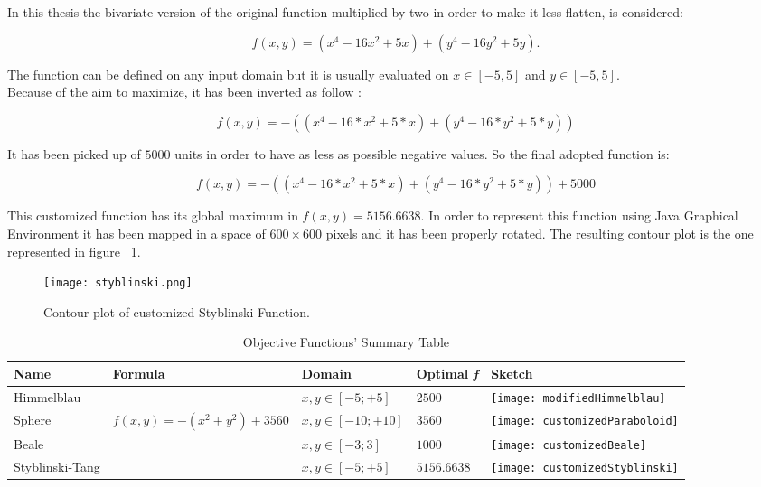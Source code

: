 In this thesis the bivariate version of the original function multiplied by two in order to make it less flatten, is considered:

\begin{equation}
f(x, y) = (x^4 - 16x^2 + 5x) + (y^4 - 16y^2 + 5y).
\end{equation}

The function can be defined on any input domain but it is usually evaluated on $x \in [-5, 5]$ and $y \in [-5, 5]$. \\

Because of the aim to maximize, it has been inverted as follow :

\begin{equation}
f(x, y) = -((x^4 - 16 * x^2 + 5 * x) + (y^4 - 16 * y^2 + 5 * y))
\end{equation}

It has been picked up of $5000$ units in order to have as less as possible negative values. So the final adopted function is: 

\begin{equation}
f(x, y) = -((x^4 - 16 * x^2 + 5 * x) + (y^4 - 16 * y^2 + 5 * y)) + 5000
\end{equation}

This customized function has its global maximum in $f(x, y) = 5156.6638$. In order to represent this function using Java Graphical Environment it has been mapped in a space of $600 \times 600$ pixels and it has been properly rotated. The resulting contour plot is the one represented in figure ~\ref{fig:ContourStyblinskiFunction}.

\begin{figure}[h!]
	\centering
	\texttt{[image: styblinski.png]}
	\caption{Contour plot of customized Styblinski Function.}
	\label{fig:ContourStyblinskiFunction}
\end{figure}

\begin{table} 
	\centering
	\caption{Objective Functions'  Summary Table}
	\begin{tabular}
		{l l l l l} \hline Name & Formula & Domain & Optimal \textit{f} & Sketch \\
		\hline Himmelblau & \vtop{\hbox{\strut $f(x, y) = - ((x^2 + y -11)^2+$}\hbox{\strut $+(x + y^2 - 7)^2) + 2500$}} & $x, y \in [-5;+5]$ & $2500$ & \parbox[c]{1em}{
			\texttt{[image: modifiedHimmelblau]}} \\
		Sphere & $f(x, y) = -(x^2 + y^2) + 3560$ &$x, y \in [-10;+10]$ & $3560$ & \parbox[c]{1em}{
			\texttt{[image: customizedParaboloid]}} \\
		Beale &  &$x, y \in [-3;3]$ & $1000$ & \parbox[c]{1em}{
			\texttt{[image: customizedBeale]}} \\
		Styblinski-Tang &  &$x, y \in [-5;+5]$ & $5156.6638$ & \parbox[c]{1em}{
			\texttt{[image: customizedStyblinski]}} \\
		\hline
	\end{tabular}
\end{table}

